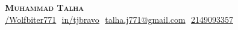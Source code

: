 \documentclass{article}%
\begin{document}
%
\normalsize%

    \begin{description}
    \item 
        \begin{center}
            \textbf{\Huge \scshape Muhammad Talha} \\ \vspace{8pt}
            \small 
            {\underline{/Wolfbiter771}} $  $
            {\underline{in/tjbravo}} $  $
            {\underline{talha.j771@gmail.com}} $  $
            {\underline{2149093357}}
        \end{center}
    \end{description}
\end{document}
